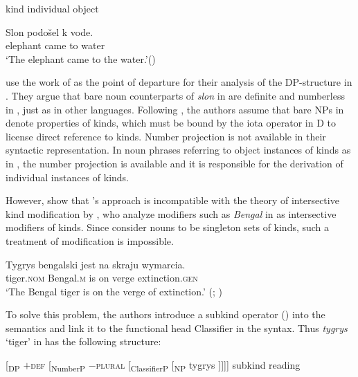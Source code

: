 \documentclass[output=paper]{langscibook}
\begin{document}
\ea \label{ex:21}
\ea  {[\textsubscript{DP} D   [\textsubscript{NP} N]]}   \hfill kind \label{ex:21a}
 \hfill individual object \label{ex:21b}
\z \z

\ea \label{ex:22}
\gll Slon podošel k vode.\\
  elephant came to water\\
\glt `The elephant came to the water.'\hfill ()
\z

\noindent {} use the work of \citeauthor{Borik.Espinal2012} as the point of departure for their analysis of the DP-structure in . They argue that bare noun counterparts of \textit{slon} in  are definite and numberless in , just as in other languages. Following \citeauthor{Borik.Espinal2012}, the authors assume that bare NPs in  denote properties of kinds, which must be bound by the iota operator in D to license direct reference to kinds. Number projection is not available in their syntactic representation. In noun phrases referring to object instances of kinds as in , the number projection is available and it is responsible for the derivation of individual instances of kinds.

However, \citeauthor{Kwapiszewski.Fuellenbach2021} show that \citeauthor{Borik.Espinal2012}'s approach is incompatible with the theory of intersective kind modification by \cite{McNally.Boleda2004}, who analyze modifiers such as \textit{Bengal} in  as intersective modifiers of kinds. Since \citeauthor{Borik.Espinal2012} consider nouns to be singleton sets of kinds, such a treatment of modification is impossible.

\ea \label{ex:23}
\gll Tygrys bengalski jest na skraju wymarcia.\\
 tiger.\textsc{nom} Bengal.\textsc{m} is on verge extinction.\textsc{gen} \\
\glt `The Bengal tiger is on the verge of extinction.'
\glt \hfill (; )
\z

\noindent To solve this problem, the authors introduce a subkind operator () into the semantics and link it to the functional head Classifier in the syntax. Thus \textit{tygrys} `tiger' in  has the following structure:

\ea \label{ex:24} [\textsubscript{DP} \textsc{$+$def} [\textsubscript{NumberP} \textsc{$-$plural} [\textsubscript{ClassifierP}    [\textsubscript{NP} tygrys ]]]]   \hfill subkind reading
\z
\end{document}
